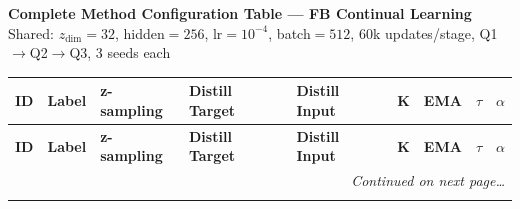 \documentclass[8pt,landscape]{extarticle}
\begin{document}
\begin{center}
{\Large\bfseries Complete Method Configuration Table --- FB Continual Learning}\\[4pt]
{\small Shared: $z_\text{dim}=32$, hidden$=256$, lr$=10^{-4}$, batch$=512$, 60k updates/stage, Q1$\to$Q2$\to$Q3, 3 seeds each}
\end{center}

\vspace{6pt}

\scriptsize
\setlength{\tabcolsep}{4pt}
\begin{longtable}{r l l l l >{\centering\arraybackslash}p{1cm} >{\centering\arraybackslash}p{1cm} >{\centering\arraybackslash}p{1cm} >{\centering\arraybackslash}p{1cm}}
\toprule
\textbf{ID} & \textbf{Label} & \textbf{z-sampling} & \textbf{Distill Target} & \textbf{Distill Input} & \textbf{K} & \textbf{EMA} & \textbf{$\tau$} & \textbf{$\alpha$} \\
\midrule
\endfirsthead

\toprule
\textbf{ID} & \textbf{Label} & \textbf{z-sampling} & \textbf{Distill Target} & \textbf{Distill Input} & \textbf{K} & \textbf{EMA} & \textbf{$\tau$} & \textbf{$\alpha$} \\
\midrule
\endhead

\midrule
\multicolumn{9}{r}{\textit{Continued on next page\ldots}} \\
\endfoot

\bottomrule
\endlastfoot


\end{longtable}
\end{document}
